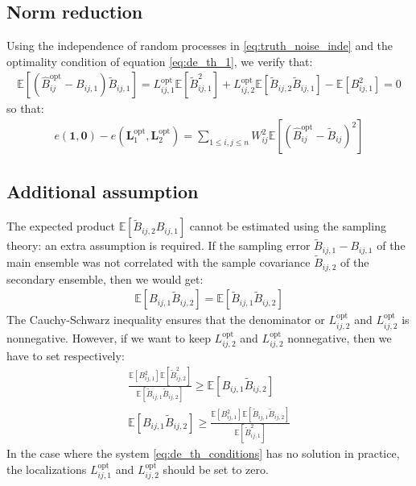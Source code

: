 \documentclass[12pt]{scrartcl}
\begin{document}
\subsection{Norm reduction}
Using the independence of random processes in \eqref{eq:truth_noise_inde} and the optimality condition of equation \eqref{eq:de_th_1}, we verify that:
\begin{align}
\mathbb{E}\left[\left(\widehat{B}_{ij}^\mathrm{opt} - B_{ij,1}\right) \widetilde{B}_{ij,1} \right] = L_{ij,1}^\mathrm{opt} \mathbb{E}\left[\widetilde{B}_{ij,1}^2\right] + L_{ij,2}^\mathrm{opt} \mathbb{E}\left[\widetilde{B}_{ij,2} \widetilde{B}_{ij,1}\right] - \mathbb{E}\left[B^2_{ij,1}\right] = 0
\end{align}
so that:
\begin{align}
e\left(\boldsymbol{1},\boldsymbol{0}\right) - e\left(\mathbf{L}^\mathrm{opt}_1,\mathbf{L}^\mathrm{opt}_2\right) = \sum_{1 \le i,j \le n} W_{ij}^2 \mathbb{E}\left[ \left(\widehat{B}_{ij}^\mathrm{opt} - \widetilde{B}_{ij}\right)^2\right]
\end{align}

\subsection{Additional assumption}
The expected product $\displaystyle \mathbb{E} \left[\widetilde{B}_{ij,2} B_{ij,1}\right]$ cannot be estimated using the sampling theory: an extra assumption is required. If the sampling error $\widetilde{B}_{ij,1} - B_{ij,1}$ of the main ensemble was not correlated with the sample covariance $\widetilde{B}_{ij,2}$ of the secondary ensemble, then we would get:
\begin{align}
\label{eq:multihyb_assumption_1}
\mathbb{E} \left[ B_{ij,1} \widetilde{B}_{ij,2}\right] = \mathbb{E} \left[ \widetilde{B}_{ij,1} \widetilde{B}_{ij,2}\right]
\end{align}
The Cauchy-Schwarz inequality ensures that the denominator or $L_{ij,2}^\mathrm{opt}$ and $L_{ij,2}^\mathrm{opt}$ is nonnegative. However, if we want to keep $L_{ij,2}^\mathrm{opt}$ and $L_{ij,2}^\mathrm{opt}$ nonnegative, then we have to set respectively:
\begin{subequations}
\label{eq:de_th_conditions}
\begin{align}
\frac{\mathbb{E} \left[B^2_{ij,1}\right] \mathbb{E} \left[\widetilde{B}_{ij,2}^2\right]}{\mathbb{E} \left[\widetilde{B}_{ij,1} \widetilde{B}_{ij,2}\right]} \ge \mathbb{E} \left[ B_{ij,1} \widetilde{B}_{ij,2}\right] \\
\mathbb{E} \left[ B_{ij,1} \widetilde{B}_{ij,2}\right] \ge \frac{\mathbb{E} \left[B^2_{ij,1}\right] \mathbb{E} \left[\widetilde{B}_{ij,1} \widetilde{B}_{ij,2}\right]}{\mathbb{E} \left[\widetilde{B}_{ij,1}^2\right]}
\end{align}
\end{subequations}
In the case where the system \eqref{eq:de_th_conditions} has no solution in practice, the localizations $L_{ij,1}^\mathrm{opt}$ and $L_{ij,2}^\mathrm{opt}$ should be set to zero.
\end{document}
